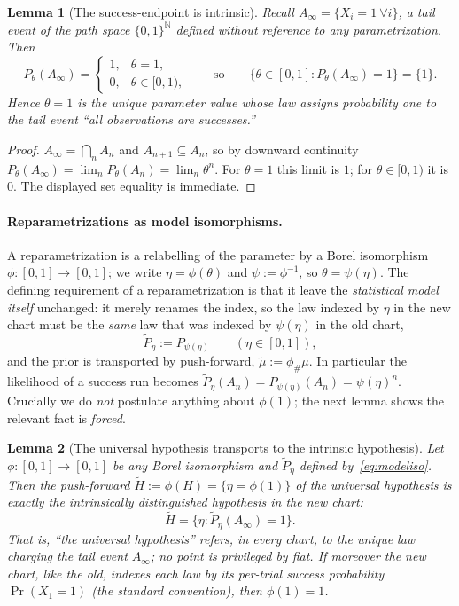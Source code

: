 \documentclass{amsart}
\newtheorem{lemma}{Lemma}
\theoremstyle{definition}
\newcommand{\N}{\mathbb{N}}
\begin{document}
\begin{lemma}[The success-endpoint is intrinsic]\label{lem:intrinsic}
Recall $A_\infty=\{X_i=1\ \forall i\}$, a tail event of the path space
$\{0,1\}^\N$ defined without reference to any parametrization. Then
\[
  P_\theta(A_\infty)=\begin{cases}1,&\theta=1,\\[1mm]0,&\theta\in[0,1),\end{cases}
  \qquad\text{so}\qquad
  \{\theta\in[0,1]:P_\theta(A_\infty)=1\}=\{1\}.
\]
Hence $\theta=1$ is the \emph{unique} parameter value whose law assigns
probability one to the tail event ``all observations are successes.''
\end{lemma}

\begin{proof}
$A_\infty=\bigcap_n A_n$ and $A_{n+1}\subseteq A_n$, so by downward continuity
$P_\theta(A_\infty)=\lim_n P_\theta(A_n)=\lim_n\theta^n$. For $\theta=1$ this
limit is $1$; for $\theta\in[0,1)$ it is $0$. The displayed set equality is
immediate.
\end{proof}

\paragraph{Reparametrizations as model isomorphisms.}
A reparametrization is a relabelling of the parameter by a Borel isomorphism
$\phi:[0,1]\to[0,1]$; we write $\eta=\phi(\theta)$ and $\psi:=\phi^{-1}$, so
$\theta=\psi(\eta)$. The defining requirement of a reparametrization is that it
leave the \emph{statistical model itself} unchanged: it merely renames the index,
so the law indexed by $\eta$ in the new chart must be the \emph{same} law that was
indexed by $\psi(\eta)$ in the old chart,
\begin{equation}\label{eq:modeliso}
  \tilde P_\eta:=P_{\psi(\eta)}\qquad(\eta\in[0,1]),
\end{equation}
and the prior is transported by push-forward, $\tilde\mu:=\phi_\#\mu$. In
particular the likelihood of a success run becomes
$\tilde P_\eta(A_n)=P_{\psi(\eta)}(A_n)=\psi(\eta)^n$. Crucially we do
\emph{not} postulate anything about $\phi(1)$; the next lemma shows the relevant
fact is \emph{forced}.

\begin{lemma}[The universal hypothesis transports to the intrinsic
hypothesis]\label{lem:fix1}
Let $\phi:[0,1]\to[0,1]$ be any Borel isomorphism and $\tilde P_\eta$ defined
by~\eqref{eq:modeliso}. Then the push-forward $\tilde H:=\phi(H)=\{\eta=\phi(1)\}$
of the universal hypothesis is exactly the intrinsically distinguished hypothesis
in the new chart:
\[
  \tilde H=\{\eta:\tilde P_\eta(A_\infty)=1\}.
\]
That is, ``the universal hypothesis'' refers, in every chart, to the unique law
charging the tail event $A_\infty$; no point is privileged by fiat. If moreover
the new chart, like the old, indexes each law by its per-trial success
probability $\Pr(X_1=1)$ (the standard convention), then $\phi(1)=1$.
\end{lemma}
\end{document}
